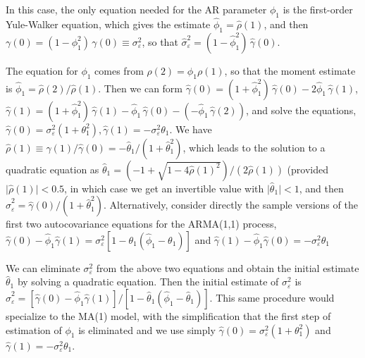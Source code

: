 \begin{ex}[AR(1) Model]
 In this case, the only equation needed for the AR parameter $\phi_1$ is the first-order Yule-Walker equation, which gives the estimate $\hat{\phi}_1 = \hat{\rho}(1)$, and then $\gamma(0) = (1- \phi_1^2)\,\gamma(0) \equiv \sigma_{\varepsilon}^2$, so that $\hat{\sigma}_{\varepsilon}^2 = (1 - \hat{\phi}_1^2)\,\hat{\gamma}(0)$. \xqed
 \end{ex}


\begin{ex}
 The equation for $\phi_1$ comes from $\rho(2) = \phi_1 \rho(1)$, so that the moment estimate is $\hat{\phi}_1 = \hat{\rho}(2) / \hat{\rho}(1)$. Then we can form $\hat{\gamma}(0) = (1+\hat{\phi}_1^2)\,\hat{\gamma}(0) - 2\hat{\phi}_1\,\hat{\gamma}(1)$, $\hat{\gamma}(1) = (1+\hat{\phi}_1^2)\,\hat{\gamma}(1) - \hat{\phi}_1\,\hat{\gamma}(0) - (- \hat{\phi}_1\,\hat{\gamma}(2))$, and solve the equations, $\hat{\gamma}(0) = \sigma_{\varepsilon}^2(1 + \theta_1^2), \hat{\gamma}(1) = -\sigma_{\varepsilon}^2\theta_1$. We have $\hat{\rho}(1) \equiv \hat{\gamma}(1)/\hat{\gamma}(0) = -\hat{\theta}_1/(1 + \hat{\theta}_1^2)$, which leads to the solution to a quadratic equation as $\hat{\theta}_1 = \left(-1 + \sqrt{1-4\hat{\rho}(1)^2} \right) / (2\hat{\rho}(1))$ (provided $\lvert \hat{\rho}(1) \rvert < 0.5$, in which case we get an invertible value with $\lvert \hat{\theta}_1 \rvert < 1$, and then $\hat{\sigma}_{\varepsilon}^2 = \hat{\gamma}(0)/(1+\hat{\theta}_1^2)$. Alternatively, consider directly the sample versions of the first two autocovariance equations for the ARMA(1,1) process, $\hat{\gamma}(0) - \hat{\phi}_1\hat{\gamma}(1) = \sigma_{\varepsilon}^2[1 - \theta_1(\hat{\phi}_1 - \theta_1)]$ and $\hat{\gamma}(1) - \hat{\phi}_1\hat{\gamma}(0) = -\sigma_{\varepsilon}^2\theta_1$

We can eliminate $\sigma_{\varepsilon}^2$ from the above two equations and obtain the initial estimate $\hat{\theta}_1$ by solving a quadratic equation. Then the initial estimate of $\sigma_{\varepsilon}^2$ is $\hat{\sigma}_{\varepsilon}^2 = [\hat{\gamma}(0) - \hat{\phi}_1\hat{\gamma}(1)]/[1 - \hat{\theta}_1(\hat{\phi}_1 - \hat{\theta}_1)]$. This same procedure would specialize to the MA(1) model, with the simplification that the first step of estimation of $\phi_1$ is eliminated and we use simply $\hat{\gamma}(0) = \sigma_{\varepsilon}^2(1 + \theta_1^2)$ and $\hat{\gamma}(1) = -\sigma_{\varepsilon}^2\theta_1$. \xqed
 \end{ex}


